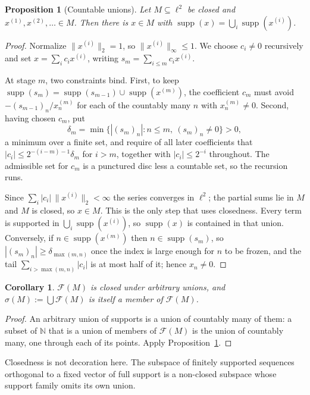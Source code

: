 \documentclass[11pt,reqno]{amsart}
\newtheorem{proposition}[theorem]{Proposition}
\newtheorem{corollary}[theorem]{Corollary}
\theoremstyle{definition}
\DeclareMathOperator{\supp}{supp}
\newcommand{\N}{\mathbb{N}}
\newcommand{\F}{\mathcal{F}}
\begin{document}
\begin{proposition}[Countable unions]\label{prop:countableunion}
Let $M\subseteq\ell^2$ be closed and $x^{(1)},x^{(2)},\dots\in M$. Then there
is $x\in M$ with $\supp(x)=\bigcup_i\supp(x^{(i)})$.
\end{proposition}

\begin{proof}
Normalize $\|x^{(i)}\|_2=1$, so $\|x^{(i)}\|_\infty\le1$. We choose $c_i\neq0$
recursively and set $x=\sum_ic_ix^{(i)}$, writing $s_m=\sum_{i\le m}c_ix^{(i)}$.

At stage $m$, two constraints bind. First, to keep
$\supp(s_m)=\supp(s_{m-1})\cup\supp(x^{(m)})$, the coefficient $c_m$ must avoid
$-(s_{m-1})_n/x^{(m)}_n$ for each of the countably many $n$ with
$x^{(m)}_n\neq0$. Second, having chosen $c_m$, put
\[
\delta_m=\min\{|(s_m)_n|:n\le m,\ (s_m)_n\neq0\}>0,
\]
a minimum over a finite set, and require of all later coefficients that
$|c_i|\le2^{-(i-m)-1}\delta_m$ for $i>m$, together with $|c_i|\le2^{-i}$
throughout. The admissible set for $c_m$ is a punctured disc less a countable
set, so the recursion runs.

Since $\sum_i|c_i|\,\|x^{(i)}\|_2<\infty$ the series converges in $\ell^2$; the
partial sums lie in $M$ and $M$ is closed, so $x\in M$. This is the only step
that uses closedness. Every term is supported in $\bigcup_i\supp(x^{(i)})$, so
$\supp(x)$ is contained in that union. Conversely, if $n\in\supp(x^{(m)})$ then
$n\in\supp(s_m)$, so $|(s_m)_n|\ge\delta_{\max(m,n)}$ once the index is large
enough for $n$ to be frozen, and the tail $\sum_{i>\max(m,n)}|c_i|$ is at most
half of it; hence $x_n\neq0$.
\end{proof}

\begin{corollary}\label{cor:arbunion}
$\F(M)$ is closed under arbitrary unions, and $\sigma(M):=\bigcup\F(M)$ is
itself a member of $\F(M)$.
\end{corollary}

\begin{proof}
An arbitrary union of supports is a union of countably many of them: a subset
of $\N$ that is a union of members of $\F(M)$ is the union of countably many,
one through each of its points. Apply
Proposition~\ref{prop:countableunion}.
\end{proof}

Closedness is not decoration here. The subspace of finitely supported sequences
orthogonal to a fixed vector of full support is a non-closed subspace whose
support family omits its own union.
\end{document}
